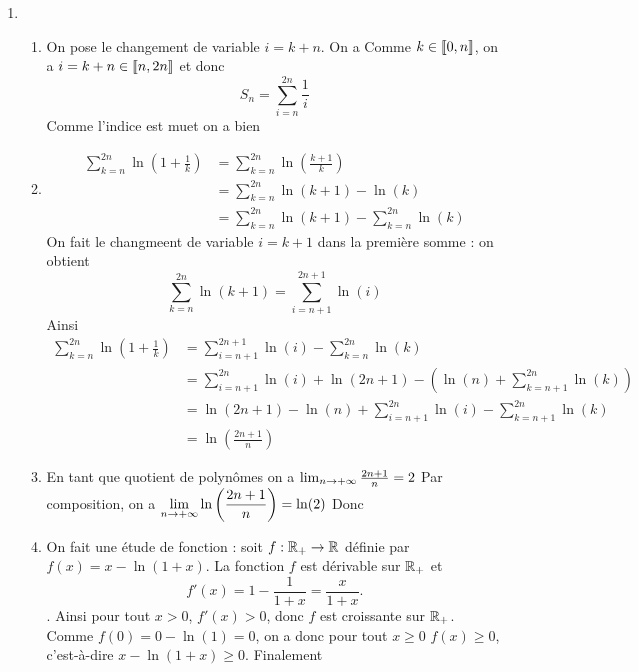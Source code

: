 \documentclass[a4paper, 11pt]{article}
\begin{document}
\begin{correction}
\begin{enumerate}
\begin{enumerate}
\end{enumerate}
\item 
\begin{enumerate}



 
 \item On pose le changement de variable $i=k+n$. On a 
 Comme $k\in \llbracket 0,n\rrbracket$, on a $i=k+n\in \llbracket n,2n\rrbracket$ et donc 
 $$S_n = \sum_{i=n}^{2n} \frac{1}{i}$$
 Comme l'indice est muet on a bien 
 
 \item 
 \begin{align*}
 \sum_{k=n}^{2n} \ln\left( 1 +\frac{1}{k}\right) &=  \sum_{k=n}^{2n} \ln\left( \frac{k+1}{k}\right)\\
  &=  \sum_{k=n}^{2n} \ln\left( k+1\right) - \ln(k)\\
  &=  \sum_{k=n}^{2n} \ln\left( k+1\right) -  \sum_{k=n}^{2n} \ln(k)
 \end{align*}
 On fait le changmeent de variable $i = k+1$  dans la première somme : on obtient 
$$ \sum_{k=n}^{2n} \ln\left( k+1\right)  = \sum_{i=n+1}^{2n+1} \ln(i)  $$
Ainsi 
 \begin{align*}
 \sum_{k=n}^{2n} \ln\left( 1 +\frac{1}{k}\right) &= \sum_{i=n+1}^{2n+1} \ln(i)  - \sum_{k=n}^{2n}\ln(k)\\
 &=\sum_{i=n+1}^{2n} \ln(i) +\ln(2n+1)  -\left( \ln(n)+ \sum_{k=n+1}^{2n}\ln(k)\right)\\
  &=\ln(2n+1) -\ln(n) + \sum_{i=n+1}^{2n} \ln(i) - \sum_{k=n+1}^{2n}\ln(k)\\
  &=\ln\left(\frac{2n+1}{n}\right)
 \end{align*}

\item En tant que quotient de polynômes on a $\lim_{n\rightarrow +\infty } \frac{2n+1}{n}= 2$
Par composition, on a 
$\displaystyle \lim_{n\rightarrow+\infty }  \ln\left(\frac{2n+1}{n}\right)= \ln(2)$
Donc 

\item On fait une étude de fonction : soit $f : \mathbb{R}_+ \rightarrow \mathbb{R}$ définie par $f(x)=x-\ln(1+x)$.  La fonction $f$ est dérivable sur $\mathbb{R}_+$ et $$f'(x) =1 -\frac{1}{1+x}= \frac{x}{1+x}.$$.
Ainsi pour tout $x>0$, $f'(x)>0$, donc $f$ est croissante sur $\mathbb{R}_+$. Comme $f(0)=0-\ln(1) =0$, on a donc pour tout $x\geq 0$
$f(x)\geq 0$, c'est-à-dire $x-\ln(1+x)\geq 0$. Finalement 



\end{enumerate}
\end{enumerate}
\end{correction}
\end{document}
